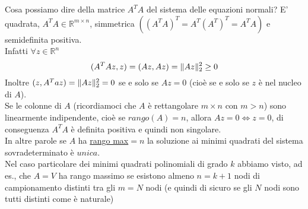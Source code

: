 \vspace{0.2cm}
Cosa possiamo dire della matrice $A^TA$ del sistema delle equazioni normali?
E' quadrata, $A^TA \in \mathbb{R}^{m\times n}$, simmetrica $((A^TA)^T = A^T(A^T)^T = A^TA)$ e semidefinita positiva. \\
Infatti $\forall z \in \mathbb{R}^n$
\begin{equation*}
    (A^TAz,z) = (Az,Az)=\lVert Az\rVert_2^2 \geq 0
\end{equation*}
Inoltre $(z,A^Taz)=\lVert Az\rVert_2^2=0$ se e solo se $Az=0$ (cioè se e solo se $z$ è nel nucleo di $A$). \\
Se le colonne di $A$ (ricordiamoci che $A$ è rettangolare $m\times n$ con $m>n$) sono linearmente indipendente, cioè se $rango(A)=n$, allora $Az=0 \Leftrightarrow z = 0$, di conseguenza $A^TA$ è definita positiva e quindi non singolare. \\
In altre parole se $A$ ha \uline{rango max}$=n$ la soluzione ai minimi quadrati del sistema sovradeterminato è $unica$. \\
Nel caso particolare dei minimi quadrati polinomiali di grado $k$ abbiamo visto, ad es., che $A=V$ ha rango massimo se esistono almeno $n=k+1$ nodi di campionamento distinti tra gli $m=N$ nodi (e quindi di sicuro se gli $N$ nodi sono tutti distinti come è naturale)
